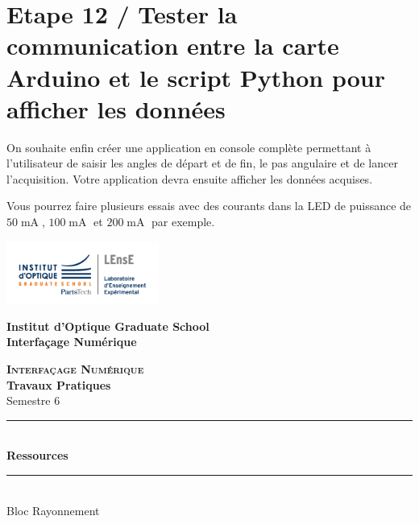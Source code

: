 \documentclass[a4paper,11pt,titlepage]{article} %
\begin{document}
\section{Etape 12 / Tester la communication entre la carte Arduino et le script Python pour afficher les données}

On souhaite enfin créer une application en console complète permettant à l'utilisateur de saisir les angles de départ et de fin, le pas angulaire et de lancer l'acquisition. Votre application devra ensuite afficher les données acquises.

Vous pourrez faire plusieurs essais avec des courants dans la LED de puissance de $50\operatorname{mA}$, $100\operatorname{mA}$ et $200\operatorname{mA}$ par exemple.


\newpage

\newpage
\begin{center}
	\begin{minipage}{2.5cm}
	\begin{center}
		\includegraphics[width=5cm]{images/Logo-LEnsE.png}
	\end{center}
\end{minipage}\hfill
\begin{minipage}{10cm}
	\begin{center}
	\textbf{Institut d'Optique Graduate School }\\[0.1cm]
    \textbf{Interfaçage Numérique}


	\end{center}
\end{minipage}\hfill


\vspace{2cm}


{\Large \bfseries \textsc{Interfaçage Numérique}} \\[0.5cm]
{\large \bfseries Travaux Pratiques} \\[0.2cm]
Semestre 6

\vspace{1cm}

\rule{\linewidth}{0.4mm} \\[0.4cm]
{ \Large \bfseries\color{violet_iogs} Ressources \\[0.4cm] }
\rule{\linewidth}{0.4mm} \\[1cm]
{\large Bloc Rayonnement}

\end{center}
\end{document}

